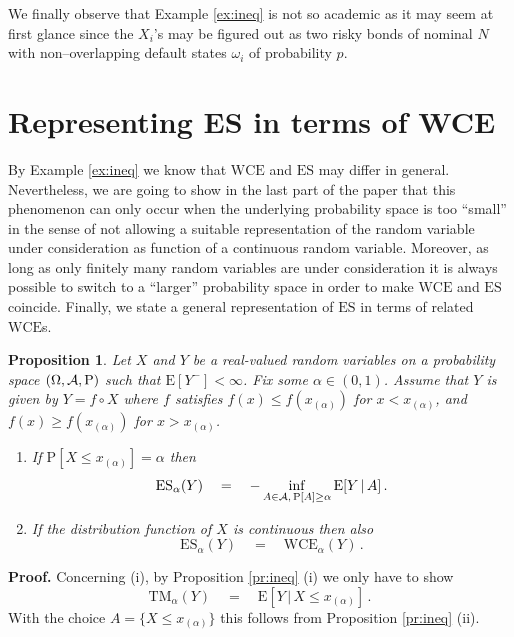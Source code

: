 \documentclass[11pt,a4paper,leqno]{article}
\newtheorem{proposition}[theorem]{Proposition}
\begin{document}
We finally observe that Example  \ref{ex:ineq} is not so academic as it may
seem at first glance since the 
$X_i$'s may be figured out as two risky bonds of nominal $N$ with non--overlapping default states $\omega_i$ of probability $p$.


\section{Representing ES in terms of WCE}
\label{sec:wce}
\setcounter{equation}{0}

By Example \ref{ex:ineq} we know that $\mathrm{WCE}$ and $\mathrm{ES}$ may differ in general.
Nevertheless, we are going to show in the last part of the paper that this phenomenon can
only occur when the underlying probability space is too ``small'' in the sense of not allowing
a suitable representation of the random variable under consideration as function of a continuous
random variable.
Moreover, as long as only finitely many random variables are under consideration it is always
possible to switch to a ``larger'' probability space in order to make
$\mathrm{WCE}$ and $\mathrm{ES}$ coincide. Finally, we state a general
representation
of $\mathrm{ES}$ in terms of related $\mathrm{WCE}$s.

\begin{proposition}\label{pr:wce} 
Let $X$ and $Y$ be a real-valued random variables  on a probability 
space $(\Omega, {\cal A}, \mathrm{P})$ such that  $\mathrm{E}[Y^-] < \infty$. Fix some $\alpha \in (0,1)$.
Assume that $Y$ is given by $Y = f \circ X$ where $f$ satisfies
$f(x) \le f(x_{(\alpha)})$ for $x <
x_{(\alpha)}$, and $f(x) \ge f(x_{(\alpha)})$ for $x > x_{(\alpha)}$.
\begin{enumerate}
\item If $\mathrm{P}[X \le x_{(\alpha)}] = \alpha$ then
$$
\mathrm{ES}_\alpha(Y) \quad= \quad - \inf_{A \in {\cal A},\, \mathrm{P}[A] \ge \alpha} \mathrm{E}[ Y\,|\, A]\,.
$$
%
\item If the distribution function of $X$ is continuous then also
$$
\mathrm{ES}_\alpha(Y) \quad= \quad \mathrm{WCE}_\alpha(Y)\,.
$$
\end{enumerate}
\end{proposition}
%
%
\textbf{Proof.} Concerning (i), by Proposition \ref{pr:ineq} (i) we only have to show
\begin{equation}
\mathrm{TM}_\alpha(Y) \quad = \quad \mathrm{E}[ Y\,|\, X \le x_{(\alpha)}]\,.
  \label{eq:ineq15}
\end{equation}
With the choice $A = \{X \le x_{(\alpha)}\}$ this follows from Proposition \ref{pr:ineq} (ii).
\end{document}
